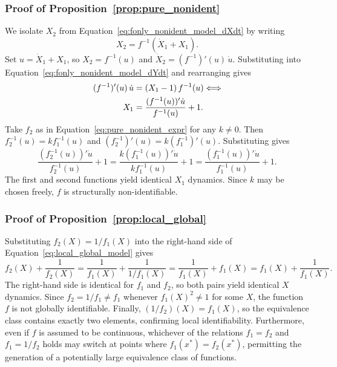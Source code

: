 \documentclass{article}
\theoremstyle{plain}
\theoremstyle{definition}
\begin{document}
{\subsubsection{Proof of Proposition~\ref{prop:pure_nonident}} \label{appendix:proof_pure}

We isolate $X_2$ from Equation~\eqref{eq:fonly_nonident_model_dXdt} by writing
\begin{equation*}
    X_2 = f^{-1}(\dot{X}_1 + X_1).
\end{equation*}
Set $u = \dot{X}_1 + X_1$, so $X_2 = f^{-1}(u)$ and $\dot{X}_2 = (f^{-1})'(u)\,\dot{u}$. Substituting into Equation~\eqref{eq:fonly_nonident_model_dYdt} and rearranging gives
\begin{align}
    \label{eq:fonly_nonident_Xeq}
    (f^{-1})'(u)\,\dot{u} &= (X_1 - 1)\,f^{-1}(u) \notag \Longleftrightarrow \\
    X_1 &= \frac{(f^{-1}(u))'\dot{u}}{f^{-1}(u)} + 1.
\end{align}
Take $f_2$ as in Equation~\eqref{eq:pure_nonident_expr} for any $k \neq 0$. Then $f_2^{-1}(u) = k f_1^{-1}(u)$ and $(f_2^{-1})'(u) = k(f_1^{-1})'(u)$. Substituting gives
\begin{equation*}
    \frac{(f_2^{-1}(u))'\dot{u}}{f_2^{-1}(u)} + 1 = \frac{k(f_1^{-1}(u))'\dot{u}}{k f_1^{-1}(u)} + 1 = \frac{(f_1^{-1}(u))'\dot{u}}{f_1^{-1}(u)} + 1.
\end{equation*}
The first and second functions yield identical $X_1$ dynamics. Since $k$ may be chosen freely, $f$ is structurally non-identifiable.

\subsubsection{Proof of Proposition~\ref{prop:local_global}} \label{appendix:proof_local_global}

Substituting $f_2(X) = 1/f_1(X)$ into the right-hand side of Equation~\eqref{eq:local_global_model} gives
\begin{equation*}
    f_2(X) + \frac{1}{f_2(X)} = \frac{1}{f_1(X)} + \frac{1}{1/f_1(X)} = \frac{1}{f_1(X)} + f_1(X) = f_1(X) + \frac{1}{f_1(X)}.
\end{equation*}
The right-hand side is identical for $f_1$ and $f_2$, so both pairs yield identical $X$ dynamics. Since $f_2 = 1/f_1 \neq f_1$ whenever $f_1(X)^2 \neq 1$ for some $X$, the function $f$ is not globally identifiable. Finally, $(1/f_2)(X) = f_1(X)$, so the equivalence class contains exactly two elements, confirming local identifiability. Furthermore, even if $f$ is assumed to be continuous, whichever of the relations $f_1=f_2$ and $f_1=1/f_2$ holds may switch at points where $f_1(x^*)=f_2(x^*)$, permitting the generation of a potentially large equivalence class of functions.

}
\end{document}
